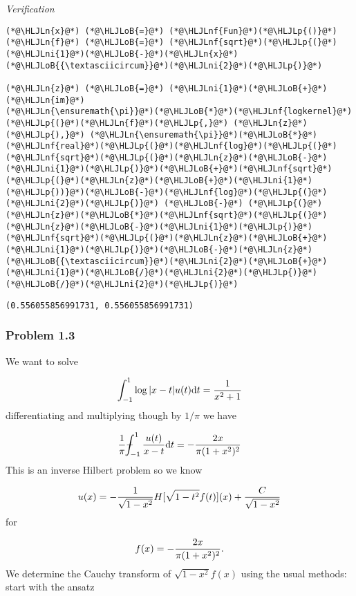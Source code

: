 \documentclass[12pt,landscape]{article}
\newcommand{\HLJLn}[1]{#1}
\newcommand{\HLJLnf}[1]{\textcolor[RGB]{66,102,213}{#1}}
\newcommand{\HLJLni}[1]{\textcolor[RGB]{59,151,46}{#1}}
\newcommand{\HLJLoB}[1]{\textcolor[RGB]{102,102,102}{\textbf{#1}}}
\newcommand{\HLJLp}[1]{#1}
\def\D{ {\rm d} }
\def\Xint#1{ \mathchoice
   {\XXint\displaystyle\textstyle{#1} }%
   {\XXint\textstyle\scriptstyle{#1} }%
   {\XXint\scriptstyle\scriptscriptstyle{#1} }%
   {\XXint\scriptscriptstyle\scriptscriptstyle{#1} }%
   \!\int}
\def\XXint#1#2#3{ {\setbox0=\hbox{$#1{#2#3}{\int}$}
     \vcenter{\hbox{$#2#3$}}\kern-.5\wd0} }
\def\dashint{\Xint-}
\def\dt{\D t}
\begin{document}
{\emph{Verification}


\begin{lstlisting}
(*@\HLJLn{x}@*) (*@\HLJLoB{=}@*) (*@\HLJLnf{Fun}@*)(*@\HLJLp{()}@*)
(*@\HLJLn{f}@*) (*@\HLJLoB{=}@*) (*@\HLJLnf{sqrt}@*)(*@\HLJLp{(}@*)(*@\HLJLni{1}@*)(*@\HLJLoB{-}@*)(*@\HLJLn{x}@*)(*@\HLJLoB{{\textasciicircum}}@*)(*@\HLJLni{2}@*)(*@\HLJLp{)}@*)

(*@\HLJLn{z}@*) (*@\HLJLoB{=}@*) (*@\HLJLni{1}@*)(*@\HLJLoB{+}@*)(*@\HLJLn{im}@*)
(*@\HLJLn{\ensuremath{\pi}}@*)(*@\HLJLoB{*}@*)(*@\HLJLnf{logkernel}@*)(*@\HLJLp{(}@*)(*@\HLJLn{f}@*)(*@\HLJLp{,}@*) (*@\HLJLn{z}@*)(*@\HLJLp{),}@*) (*@\HLJLn{\ensuremath{\pi}}@*)(*@\HLJLoB{*}@*)(*@\HLJLnf{real}@*)(*@\HLJLp{(}@*)(*@\HLJLnf{log}@*)(*@\HLJLp{(}@*)(*@\HLJLnf{sqrt}@*)(*@\HLJLp{(}@*)(*@\HLJLn{z}@*)(*@\HLJLoB{-}@*)(*@\HLJLni{1}@*)(*@\HLJLp{)}@*)(*@\HLJLoB{+}@*)(*@\HLJLnf{sqrt}@*)(*@\HLJLp{(}@*)(*@\HLJLn{z}@*)(*@\HLJLoB{+}@*)(*@\HLJLni{1}@*)(*@\HLJLp{))}@*)(*@\HLJLoB{-}@*)(*@\HLJLnf{log}@*)(*@\HLJLp{(}@*)(*@\HLJLni{2}@*)(*@\HLJLp{)}@*) (*@\HLJLoB{-}@*) (*@\HLJLp{(}@*)(*@\HLJLn{z}@*)(*@\HLJLoB{*}@*)(*@\HLJLnf{sqrt}@*)(*@\HLJLp{(}@*)(*@\HLJLn{z}@*)(*@\HLJLoB{-}@*)(*@\HLJLni{1}@*)(*@\HLJLp{)}@*)(*@\HLJLnf{sqrt}@*)(*@\HLJLp{(}@*)(*@\HLJLn{z}@*)(*@\HLJLoB{+}@*)(*@\HLJLni{1}@*)(*@\HLJLp{)}@*)(*@\HLJLoB{-}@*)(*@\HLJLn{z}@*)(*@\HLJLoB{{\textasciicircum}}@*)(*@\HLJLni{2}@*)(*@\HLJLoB{+}@*)(*@\HLJLni{1}@*)(*@\HLJLoB{/}@*)(*@\HLJLni{2}@*)(*@\HLJLp{)}@*)(*@\HLJLoB{/}@*)(*@\HLJLni{2}@*)(*@\HLJLp{)}@*)
\end{lstlisting}

\begin{lstlisting}
(0.556055856991731, 0.556055856991731)
\end{lstlisting}


\subsubsection{Problem 1.3}
We want to solve

\[
\int_{-1}^1 \log |x-t| u(t) \dt = {1 \over x^2 + 1}
\]
differentiating and multiplying though by $1/\pi$ we have

\[
{1 \over \pi} \dashint_{-1}^1 {u(t) \over x-t} \D t = -{2 x \over \pi (1+x^2)^2}
\]
This is an inverse Hilbert problem so we know

\[
u(x) = -{1 \over \sqrt{1-x^2} } H[\sqrt{1-t^2} f(t)](x)  + {C \over \sqrt{1-x^2}}
\]
for

\[
f(x) =  -{2 x \over \pi (1+x^2)^2}.
\]
We determine the Cauchy transform of $\sqrt{1-x^2} f(x)$ using the usual methods: start with the ansatz

}
\end{document}

